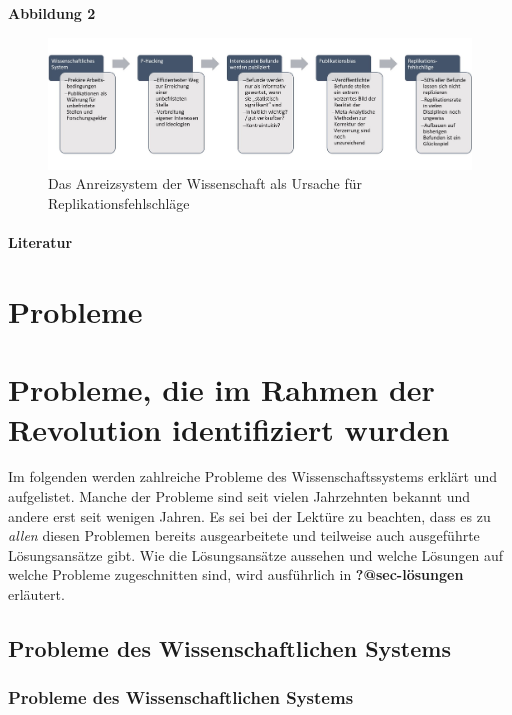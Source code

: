 \documentclass[
  letterpaper,
  DIV=11,
  numbers=noendperiod]{scrreprt}
\begin{document}
\textbf{Abbildung 2}

\begin{figure}[H]

{\centering \includegraphics{images/struktur.jpg}

}

\caption{Das Anreizsystem der Wissenschaft als Ursache für
Replikationsfehlschläge}

\end{figure}%

\subsection{Literatur}\label{literatur-5}

\part{Probleme}

\part{Probleme, die im Rahmen der Revolution identifiziert wurden}

Im folgenden werden zahlreiche Probleme des Wissenschaftssystems erklärt
und aufgelistet. Manche der Probleme sind seit vielen Jahrzehnten
bekannt und andere erst seit wenigen Jahren. Es sei bei der Lektüre zu
beachten, dass es zu \emph{allen} diesen Problemen bereits
ausgearbeitete und teilweise auch ausgeführte Lösungsansätze gibt. Wie
die Lösungsansätze aussehen und welche Lösungen auf welche Probleme
zugeschnitten sind, wird ausführlich in \textbf{?@sec-lösungen}
erläutert.

\chapter{Probleme des Wissenschaftlichen
Systems}\label{probleme-des-wissenschaftlichen-systems}

\section{Probleme des Wissenschaftlichen
Systems}\label{probleme-des-wissenschaftlichen-systems-1}
\end{document}
